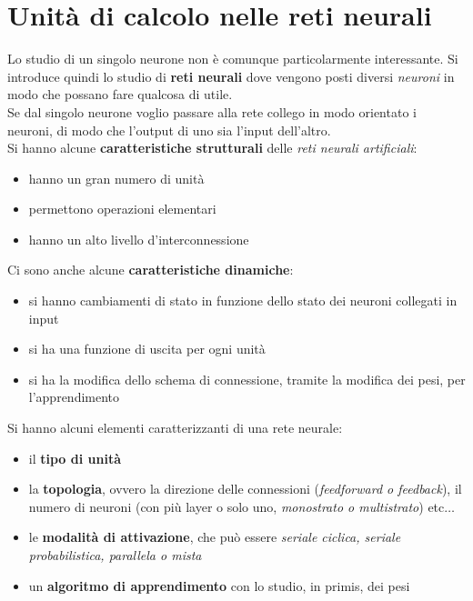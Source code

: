 \section{Unità di calcolo nelle reti neurali}
Lo studio di un singolo neurone non è comunque particolarmente interessante. Si
introduce quindi lo studio di \textbf{reti neurali} dove vengono posti diversi
\textit{neuroni} in modo che possano fare qualcosa di utile.\\
Se dal singolo neurone voglio passare alla rete collego in modo orientato i
neuroni, di modo che l'output di uno sia l'input dell'altro. \\
Si hanno alcune \textbf{caratteristiche strutturali} delle \textit{reti neurali
artificiali}:
\begin{itemize}
	\item hanno un gran numero di unità
	\item permettono operazioni elementari
	\item hanno un alto livello d'interconnessione
\end{itemize}
Ci sono anche alcune \textbf{caratteristiche dinamiche}:
\begin{itemize}
	\item si hanno cambiamenti di stato in funzione dello stato dei neuroni
	      collegati in input
	\item si ha una funzione di uscita per ogni unità
	\item si ha la modifica dello schema di connessione, tramite la modifica dei
	      pesi, per l'apprendimento
\end{itemize}
Si hanno alcuni elementi caratterizzanti di una rete neurale:
\begin{itemize}
	\item il \textbf{tipo di unità}
	\item la \textbf{topologia}, ovvero la direzione delle connessioni
	      (\textit{feedforward \textnormal{o} feedback}), il numero di neuroni (con più
	      layer o solo uno, \textit{monostrato \textnormal{o} multistrato}) etc$\ldots$
	\item le \textbf{modalità di attivazione}, che può essere \textit{seriale
		ciclica, seriale probabilistica, parallela \textnormal{o} mista}
	\item un \textbf{algoritmo di apprendimento} con lo studio, in primis, dei
	      pesi
\end{itemize}
\newpage

